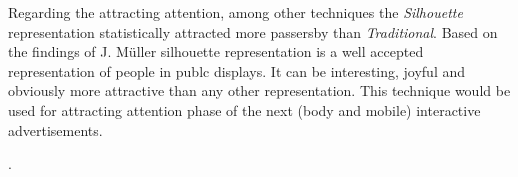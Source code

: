 Regarding the attracting attention, among other techniques the \emph{Silhouette} representation statistically attracted more passersby than \emph{Traditional}. Based on the findings of J. Müller\cite{LookingGlass} silhouette representation is a well accepted representation of people in publc displays. It can be interesting, joyful and obviously more attractive than any other representation. This technique would be used for attracting attention phase of the next (body and mobile) interactive advertisements.


\newpage
.



